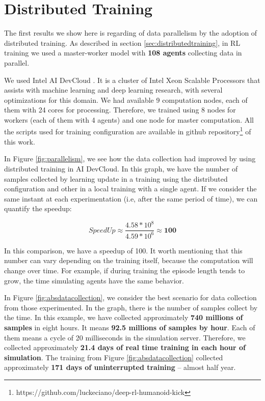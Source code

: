 \section{Distributed Training}

The first results we show here is regarding of data parallelism by the adoption of distributed training. As described in section \ref{sec:distributedtraining}, in RL training we used a master-worker model with \textbf{108 agents} collecting data in parallel.

We used Intel AI DevCloud \cite{inteldevcloud}. It is a cluster of Intel Xeon Scalable Processors that assists with machine learning and deep learning research, with several optimizations for this domain. We had available 9 computation nodes, each of them with 24 cores for processing. Therefore, we trained using 8 nodes for workers (each of them with 4 agents) and one node for master computation. All the scripts used for training configuration are available in github repository\footnote{\label{scripts} https://github.com/luckeciano/deep-rl-humanoid-kick} of this work. 

In Figure \ref{fig:parallelism}, we see how the data collection had improved by using distributed training in AI DevCloud. In this graph, we have the number of samples collected by learning update in a training using the distributed configuration and other in a local training with a single agent. If we consider the same instant at each experimentation (i.e, after the same period of time), we can quantify the speedup:

\begin{equation}
	SpeedUp \approx \frac{4.58 * 10^{8}}{4.59 * 10^{6}} \approx \textbf{100}
\end{equation}

In this comparison, we have a speedup of 100. It worth mentioning that this number can vary depending on the training itself, because the computation will change over time. For example, if during training the episode length tends to grow, the time simulating agents have the same behavior.


In Figure \ref{fig:absdatacollection}, we consider the best scenario for data collection from those experimented. In the graph, there is the number of samples collect by the time.
In this example, we have collected approximately \textbf{740 millions of samples} in eight hours. It means \textbf{92.5 millions of samples by hour}. Each of them means a cycle of 20 milliseconds in the simulation server. Therefore, we collected approximately \textbf{21.4 days of real time training in each hour of simulation}. The training from Figure \ref{fig:absdatacollection} collected approximately \textbf{171 days of uninterrupted training} -- almost half year.

